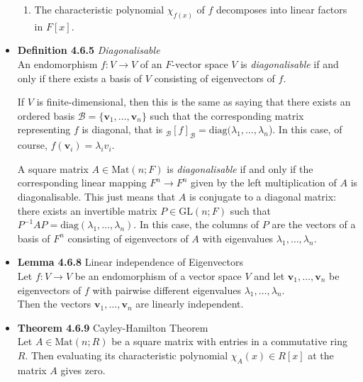 \documentclass[11pt,a4paper]{article}
\begin{document}
\begin{itemize}
\begin{enumerate}
            \item The characteristic polynomial $\chi_{f(x)}$ of $f$ decomposes into linear
                factors in $F[x]$.

        \end{enumerate}

    \item \textbf{Definition 4.6.5} \emph{Diagonalisable} \\
        An endomorphism $f : V \to V$ of an $F$-vector space $V$ is \emph{diagonalisable}
        if and only if there exists a basis of $V$ consisting of eigenvectors of $f$.

        If $V$ is finite-dimensional, then this is the same as saying that there exists an
        ordered basis $\mathcal{B} = \{ \textbf{v}_1, \ldots, \textbf{v}_n \}$
        such that the corresponding matrix representing $f$ is diagonal,
        that is $_\mathcal{B}{[f]}_\mathcal{B} = \mathrm{diag}(\lambda_1, \ldots, \lambda_n$).
        In this case, of course, $f(\textbf{v}_i) = \lambda_i v_i$.

        A square matrix $A \in \mathrm{Mat}(n; F)$ is \emph{diagonalisable} if and only if
        the corresponding linear mapping $F^n \to F^n$ given by the left multiplication of $A$
        is diagonalisable.
        This just means that $A$ is conjugate to a diagonal matrix:
        there exists an invertible matrix $P \in \mathrm{GL}(n; F)$ such that
        $P^{-1} A P = \mathrm{diag}(\lambda_1, \ldots, \lambda_n)$.
        In this case, the columns of $P$ are the vectors of a basis of $F^n$ consisting of
        eigenvectors of $A$ with eigenvalues $\lambda_1, \ldots, \lambda_n$.

    \item \textbf{Lemma 4.6.8} Linear independence of Eigenvectors \\
        Let $f : V \to V$ be an endomorphism of a vector space $V$ and let
        $\textbf{v}_1, \ldots, \textbf{v}_n$ be eigenvectors of $f$ with pairwise different
        eigenvalues $\lambda_1, \ldots, \lambda_n$. \\
        Then the vectors $\textbf{v}_1, \ldots, \textbf{v}_n$ are linearly independent.

    \item \textbf{Theorem 4.6.9} Cayley-Hamilton Theorem \\
        Let $A \in \mathrm{Mat}(n; R)$ be a square matrix with entries in a commutative ring $R$.
        Then evaluating its characteristic polynomial $\chi_A(x) \in R[x]$ at the matrix $A$ gives
        zero.

\end{itemize}
\end{document}
